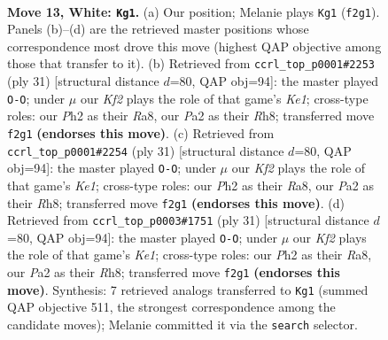 \documentclass[11pt]{article}
\begin{document}
\clearpage

\begin{figure}[p]\centering
\begin{subfigure}{0.46\textwidth}\centering
\resizebox{\linewidth}{!}{%
\newchessgame
\chessboard[
  setfen={rnbk3r/1p1nq3/4p1p1/pNPpPp1p/5P2/1P5N/P1P2KPP/R2Q1B1R w - - 0 13},
  showmover=false,
  pgfstyle=straightmove, color=movearrow, markmove={f2-g1}
]}
\caption{}
\end{subfigure}\hfill
\begin{subfigure}{0.46\textwidth}\centering
\resizebox{\linewidth}{!}{%
\newchessgame
\chessboard[
  setfen={r1b1k2r/p2n1ppp/4p3/q2pP3/1ppP1P2/8/P1QNN1PP/R3KB1R b KQkq - 1 16},
  showmover=false,
  pgfstyle=straightmove, color=movearrow, markmove={e8-g8}
]}
\caption{}
\end{subfigure}
\\[4pt]
\begin{subfigure}{0.46\textwidth}\centering
\resizebox{\linewidth}{!}{%
\newchessgame
\chessboard[
  setfen={r1b1k2r/p2n1ppp/4p3/q2pP3/1ppP1P2/8/P1QNN1PP/R3KB1R b KQkq - 1 16},
  showmover=false,
  pgfstyle=straightmove, color=movearrow, markmove={e8-g8}
]}
\caption{}
\end{subfigure}\hfill
\begin{subfigure}{0.46\textwidth}\centering
\resizebox{\linewidth}{!}{%
\newchessgame
\chessboard[
  setfen={r1b1k2r/p2n1ppp/4p3/q2pP3/1ppP1P2/8/P1QNN1PP/R3KB1R b KQkq - 1 16},
  showmover=false,
  pgfstyle=straightmove, color=movearrow, markmove={e8-g8}
]}
\caption{}
\end{subfigure}
\caption{\textbf{Move 13, White: \texttt{Kg1}.} (a) Our position; Melanie plays \texttt{Kg1} (\texttt{f2g1}). Panels (b)--(d) are the retrieved master positions whose correspondence most drove this move (highest QAP objective among those that transfer to it). (b) Retrieved from \texttt{ccrl\_top\_p0001\#2253} (ply 31) [structural distance $d$=80, QAP obj=94]: the master played \texttt{O-O}; under $\mu$ our \emph{Kf2} plays the role of that game's \emph{Ke1}; cross-type roles: our \emph{P}h2 as their \emph{R}a8, our \emph{P}a2 as their \emph{R}h8; transferred move \texttt{f2g1} \textbf{(endorses this move)}. (c) Retrieved from \texttt{ccrl\_top\_p0001\#2254} (ply 31) [structural distance $d$=80, QAP obj=94]: the master played \texttt{O-O}; under $\mu$ our \emph{Kf2} plays the role of that game's \emph{Ke1}; cross-type roles: our \emph{P}h2 as their \emph{R}a8, our \emph{P}a2 as their \emph{R}h8; transferred move \texttt{f2g1} \textbf{(endorses this move)}. (d) Retrieved from \texttt{ccrl\_top\_p0003\#1751} (ply 31) [structural distance $d$=80, QAP obj=94]: the master played \texttt{O-O}; under $\mu$ our \emph{Kf2} plays the role of that game's \emph{Ke1}; cross-type roles: our \emph{P}h2 as their \emph{R}a8, our \emph{P}a2 as their \emph{R}h8; transferred move \texttt{f2g1} \textbf{(endorses this move)}. Synthesis: 7 retrieved analogs transferred to \texttt{Kg1} (summed QAP objective 511, the strongest correspondence among the candidate moves); Melanie committed it via the \texttt{search} selector.}
\label{fig:thought-m24}
\end{figure}
\end{document}
